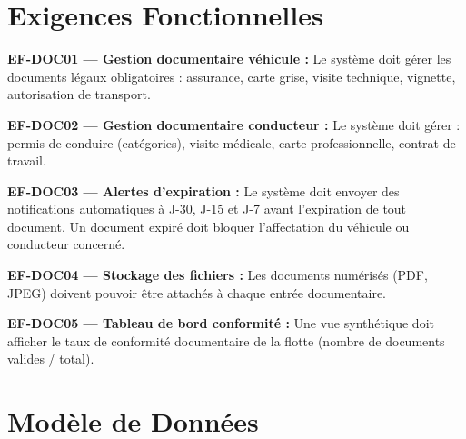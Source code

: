 \documentclass[12pt,a4paper]{report}
\begin{document}
\section{Exigences Fonctionnelles}

\begin{reqbox}
\textbf{EF-DOC01 — Gestion documentaire véhicule :} Le système doit gérer les documents légaux obligatoires : assurance, carte grise, visite technique, vignette, autorisation de transport.
\end{reqbox}

\begin{reqbox}
\textbf{EF-DOC02 — Gestion documentaire conducteur :} Le système doit gérer : permis de conduire (catégories), visite médicale, carte professionnelle, contrat de travail.
\end{reqbox}

\begin{reqbox}
\textbf{EF-DOC03 — Alertes d'expiration :} Le système doit envoyer des notifications automatiques à J-30, J-15 et J-7 avant l'expiration de tout document. Un document expiré doit bloquer l'affectation du véhicule ou conducteur concerné.
\end{reqbox}

\begin{reqbox}
\textbf{EF-DOC04 — Stockage des fichiers :} Les documents numérisés (PDF, JPEG) doivent pouvoir être attachés à chaque entrée documentaire.
\end{reqbox}

\begin{reqbox}
\textbf{EF-DOC05 — Tableau de bord conformité :} Une vue synthétique doit afficher le taux de conformité documentaire de la flotte (nombre de documents valides / total).
\end{reqbox}

\section{Modèle de Données}
\end{document}

